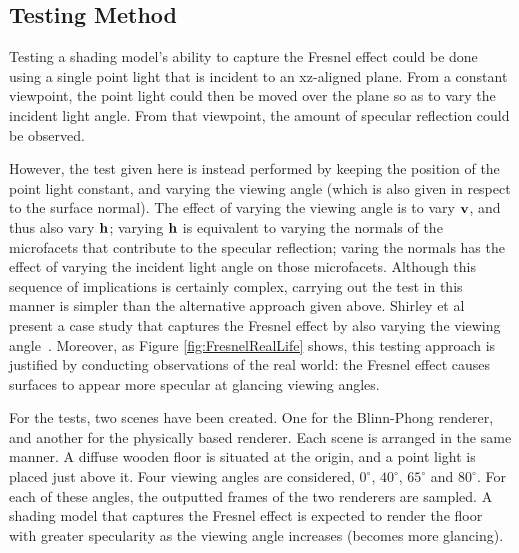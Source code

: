 \subsection{Testing Method}

Testing a shading model's ability to capture the Fresnel effect could be done using a single point light that is incident to an xz-aligned plane. From a constant viewpoint, the point light could then be moved over the plane so as to vary the incident light angle. From that viewpoint, the amount of specular reflection could be observed. 

However, the test given here is instead performed by keeping the position of the point light constant, and varying the viewing angle (which is also given in respect to the surface normal). The effect of varying the viewing angle is to vary \begin{math}\mathbf{v}\end{math}, and thus also vary \begin{math}\mathbf{h}\end{math}; varying \begin{math}\mathbf{h}\end{math} is equivalent to varying the normals of the microfacets that contribute to the specular reflection; varing the normals has the effect of varying the incident light angle on those microfacets. Although this sequence of implications is certainly complex, carrying out the test in this manner is simpler than the alternative approach given above. Shirley et al present a case study that captures the Fresnel effect by also varying the viewing angle~\cite{PractitionersReflectionModels}. Moreover, as Figure \ref{fig:FresnelRealLife} shows, this testing approach is justified by conducting observations of the real world: the Fresnel effect causes surfaces to appear more specular at glancing viewing angles.

For the tests, two scenes have been created. One for the Blinn-Phong renderer, and another for the physically based renderer. Each scene is arranged in the same manner. A diffuse wooden floor is situated at the origin, and a point light is placed just above it. Four viewing angles are considered, \begin{math}0^{\circ}\end{math}, \begin{math}40^{\circ}\end{math}, \begin{math}65^{\circ}\end{math} and \begin{math}80^{\circ}\end{math}. For each of these angles, the outputted frames of the two renderers are sampled. A shading model that captures the Fresnel effect is expected to render the floor with greater specularity as the viewing angle increases (becomes more glancing).

